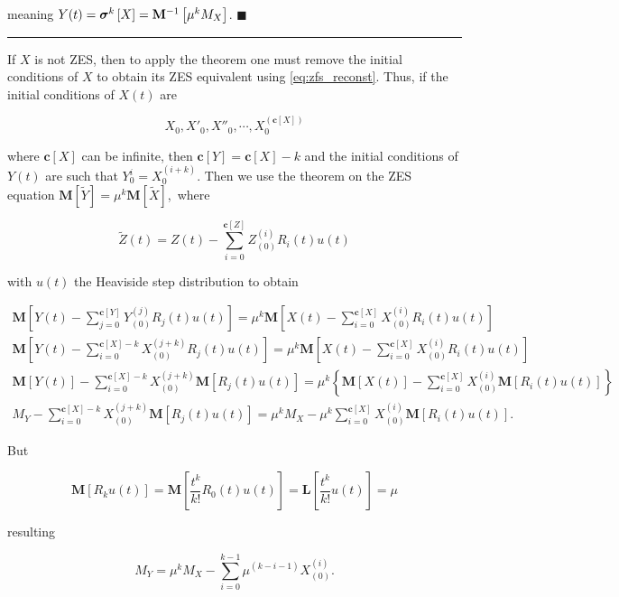 	\noindent meaning $Y(t) = \boldsymbol{\sigma}^{k}\left[X\right] = \mathbf{M}^{-1}\left[\mu^k M_X\right]$.
\hfill$\blacksquare$
\vspace{3mm}
\hrule
\vspace{3mm} %
\begin{corollary} %
	If $X$ is not ZES, then to apply the theorem one must remove the initial conditions of $X$ to obtain its ZES equivalent using \eqref{eq:zfs_reconst}. Thus, if the initial conditions of $X(t)$ are

\begin{equation} X_0,X'_0,X''_0,\cdots,X^{(\mathbf{c}\left[X\right])}_0\end{equation}

	\noindent where $\mathbf{c}\left[X\right]$ can be infinite, then $\mathbf{c}\left[Y\right] = \mathbf{c}\left[X\right] - k$ and the initial conditions of $Y(t)$ are such that $Y^{i}_0 = X^{(i+k)}_0$. Then we use the theorem on the ZES equation $\mathbf{M}\left[\tilde{Y}\right] = \mu^k\mathbf{M}\left[\tilde{X}\right]$,\ where

\begin{equation} \tilde{Z}(t) = Z(t) - \sum_{i=0}^{\mathbf{c}\left[Z\right]} Z^{(i)}_{(0)}R_i(t)u(t) \end{equation}

	\noindent with $u(t)$ the Heaviside step distribution to obtain

\begin{gather}
	\mathbf{M}\left[ Y(t) - \sum_{j=0}^{\mathbf{c}\left[Y\right]} Y^{(j)}_{(0)}R_j(t) u(t)\right] = \mu^k \mathbf{M}\left[ X(t) - \sum_{i=0}^{\mathbf{c}\left[X\right]} X^{(i)}_{(0)}R_i(t)u(t)\right] \nonumber\\[3mm]
%
	 \mathbf{M}\left[ Y(t) - \sum_{i=0}^{\mathbf{c}\left[X\right] - k} X^{(j+k)}_{(0)}R_j(t)u(t)\right]  = \mu^k \mathbf{M}\left[ X(t) - \sum_{i=0}^{\mathbf{c}\left[X\right]} X^{(i)}_{(0)}R_i(t)u(t)\right] \nonumber\\[3mm]
%
	 \mathbf{M}\left[ Y(t) \right] - \sum_{i=0}^{\mathbf{c}\left[X\right] - k} X^{(j+k)}_{(0)} \mathbf{M}\left[R_j(t)u(t)\right]  = \mu^k \left\{\mathbf{M}\left[X(t)\right] - \sum_{i=0}^{\mathbf{c}\left[X\right]} X^{(i)}_{(0)} \mathbf{M}\left[R_i(t)u(t)\right] \right\} \nonumber\\[3mm]
%
	 M_Y - \sum_{i=0}^{\mathbf{c}\left[X\right] - k} X^{(j+k)}_{(0)} \mathbf{M}\left[R_j(t)u(t)\right] = \mu^k M_X - \mu^k\sum_{i=0}^{\mathbf{c}\left[X\right]} X^{(i)}_{(0)} \mathbf{M}\left[R_i(t)u(t)\right].
\end{gather}

	But

\begin{equation} \mathbf{M}\left[R_ku(t)\right] = \mathbf{M}\left[\dfrac{t^k}{k!} R_0(t)u(t)\right] = \mathbf{L}\left[\dfrac{t^k}{k!}u(t)\right] = \mu \end{equation}

	\noindent resulting

\begin{equation}  M_Y = \mu^k M_X - \sum_{i=0}^{k-1} \mu^{(k-i-1)}X^{(i)}_{(0)}. \label{eq:final_dpo_muT}\end{equation}
\end{corollary}
